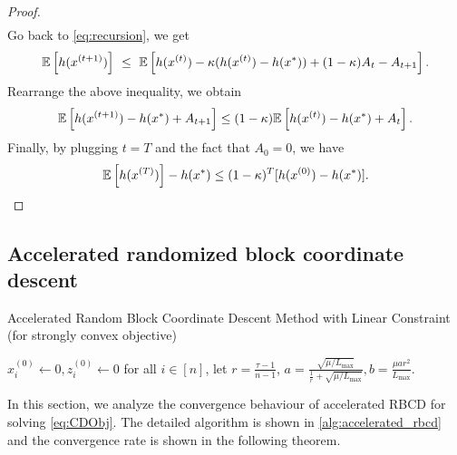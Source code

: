 \begin{proof}
\begin{align}
    \end{align}
    Go back to \eqref{eq:recursion}, we get
    \begin{align}
        \mathbb{E} \left[ h( x^{(t+1)} ) \right] ~\leq~ \mathbb{E}\left[ h(x^{(t)}) - \kappa ( h(x^{(t)}) - h(x^*) ) + (1 - \kappa) A_t - A_{t+1} \right].
    \end{align}
    Rearrange the above inequality, we obtain
    \[
        \mathbb{E} \left[ h( x^{(t+1)} ) - h(x^*) + A_{t+1} \right] \leq (1 - \kappa)  \mathbb{E} \left[ h( x^{(t)} ) - h(x^*) + A_{t} \right].
    \]
    Finally, by plugging $t = T$ and the fact that $A_0 = 0$, we have 
    \[\mathbb{E} \left[ h( x^{(T)} )\right] - h(x^*) \leq (1 - \kappa)^T[h(x^{(0)}) - h(x^*)].\]
\end{proof}


\subsection{Accelerated randomized block coordinate descent} \label{appendix:accelerated_rbcd}

\begin{algorithm}[t]
    \DontPrintSemicolon
    \caption{Accelerated Random Block Coordinate Descent Method with Linear Constraint (for strongly convex objective)}
    \label{alg:accelerated_rbcd}
    \smallskip
    $x_i^{(0)} \gets 0, z_i^{(0)} \gets 0$ for all $i \in [n]$, let $r =\frac{\tau-1}{n-1}$, $a = \frac{\sqrt{\mu/L_{\max}}}{\frac{1}{r} + \sqrt{\mu/L_{\max}}}, b = \frac{\mu a r^2}{L_{\max}}$. 
\end{algorithm}

In this section, we analyze the convergence behaviour of accelerated RBCD for solving \autoref{eq:CDObj}. The detailed algorithm is shown in \autoref{alg:accelerated_rbcd} and the convergence rate is shown in the following theorem. 

